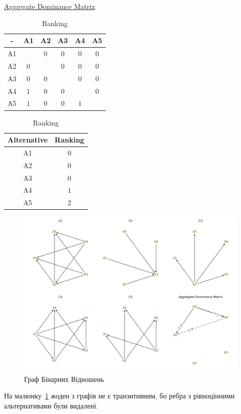 \begin{table}[!ht]
    \parbox{0.49\textwidth}{
        \centering
        \caption{
            \hyperref
            [eq:dominance]
            {Aggregate Dominance Matrix}
        }
        \label{tab:adm}

        \begin{tabular}{|c|c|c|c|c|c|}
            \toprule
            -  & A1  & A2  & A3  & A4  & A5  \\

            \midrule
            A1 &     & $0$ & $0$ & $0$ & $0$ \\
            A2 & $0$ &     & $0$ & $0$ & $0$ \\
            A3 & $0$ & $0$ &     & $0$ & $0$ \\
            A4 & $1$ & $0$ & $0$ &     & $0$ \\
            A5 & $1$ & $0$ & $0$ & $1$ &     \\

            \bottomrule
        \end{tabular}
    }
    \hfill
    \parbox{0.49\textwidth}{
        \centering
        \caption{Ranking}
        \label{tab:ranking}

        \begin{tabular}{|c|c|}
            \toprule
            Alternative & Ranking \\

            \midrule
            A1          & $0$     \\
            A2          & $0$     \\
            A3          & $0$     \\
            A4          & $1$     \\
            A5          & $2$     \\

            \bottomrule
        \end{tabular}
    }
\end{table}

\newpage

\begin{figure}[!ht]
    \centering
    \includegraphics[width=\textwidth]{./images/graph}
    \caption{Граф Бінарних Відношень}
    \label{fig:graph}
\end{figure}

\begin{large}
    На малюнку~\ref{fig:graph} жоден з графів не є транзитивним,
    бо ребра з рівноцінними альтернативами були видалені.
\end{large}

